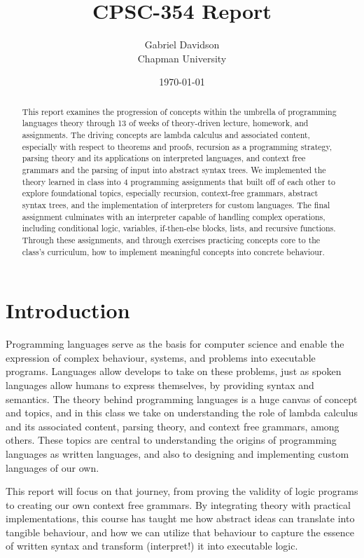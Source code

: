\documentclass{article}
\title{CPSC-354 Report}
\author{Gabriel Davidson  \\ Chapman University}
\date{\today}
\theoremstyle{theorem}
\theoremstyle{definition}
\theoremstyle{remark}
\begin{document}
\maketitle

\begin{abstract}
This report examines the progression of concepts within the umbrella of programming languages theory through 13 of weeks of theory-driven lecture, homework, and assignments. The driving concepts are lambda calculus and associated content, especially with respect to theorems and proofs, recursion as a programming strategy, parsing theory and its applications on interpreted languages, and context free grammars and the parsing of input into abstract syntax trees. We implemented the theory learned in class into 4 programming assignments that built off of each other to explore foundational topics, especially recursion, context-free grammars, abstract syntax trees, and the implementation of interpreters for custom languages. The final assignment culminates with an interpreter capable of handling complex operations, including conditional logic, variables, if-then-else blocks, lists, and recursive functions. Through these assignments, and through exercises practicing concepts core to the class's curriculum, how to implement meaningful concepts into concrete behaviour. 
\end{abstract}

\setcounter{tocdepth}{3}
\tableofcontents

\section{Introduction}\label{intro}
Programming languages serve as the basis for computer science and enable the expression of complex behaviour, systems, and problems into executable programs. Languages allow develops to take on these problems, just as spoken languages allow humans to express themselves, by providing syntax and semantics. The theory behind programming languages is a huge canvas of concept and topics, and in this class we take on understanding the role of lambda calculus and its associated content, parsing theory, and context free grammars, among others. These topics are central to understanding the origins of programming languages as written languages, and also to designing and implementing custom languages of our own.

This report will focus on that journey, from proving the validity of logic programs to creating our own context free grammars. By integrating theory with practical implementations, this course has taught me how abstract ideas can translate into tangible behaviour, and how we can utilize that behaviour to capture the essence of written syntax and transform (interpret!) it into executable logic.
\end{document}
